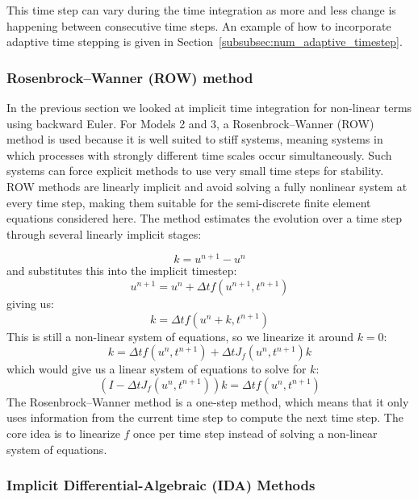 This time step can vary during the time integration as more and less change is happening between consecutive time steps. An example of how to incorporate adaptive time stepping is given in Section~\ref{subsubsec:num_adaptive_timestep}.

\subsubsection{Rosenbrock--Wanner (ROW) method}\label{subsubsec:num_ROW}

In the previous section we looked at implicit time integration for non-linear terms using backward Euler. For Models 2 and 3, a Rosenbrock--Wanner (ROW) method is used because it is well suited to stiff systems, meaning systems in which processes with strongly different time scales occur simultaneously. Such systems can force explicit methods to use very small time steps for stability. ROW methods are linearly implicit and avoid solving a fully nonlinear system at every time step, making them suitable for the semi-discrete finite element equations considered here. The method estimates the evolution over a time step through several linearly implicit stages:

\begin{equation}
    k = u^{n+1} - u^n
\end{equation}
and substitutes this into the implicit timestep:
\begin{equation}
    u^{n+1} = u^n + \Delta t f(u^{n+1},t^{n+1})
\end{equation}
giving us:
\begin{equation}
    k = \Delta t f(u^n + k, t^{n+1})
\end{equation}
This is still a non-linear system of equations, so we linearize it around $k=0$:
\begin{equation}
    k = \Delta t f(u^n, t^{n+1}) + \Delta t J_f(u^n, t^{n+1}) k
\end{equation}
which would give us a linear system of equations to solve for $k$:
\begin{equation}
    (I - \Delta t J_f(u^n, t^{n+1})) k = \Delta t f(u^n, t^{n+1})
\end{equation}
The Rosenbrock--Wanner method is a one-step method, which means that it only uses information from the current time step to compute the next time step. The core idea is to linearize $f$ once per time step instead of solving a non-linear system of equations.

\subsubsection{Implicit Differential-Algebraic (IDA) Methods}\label{subsubsec:num_IDA}

